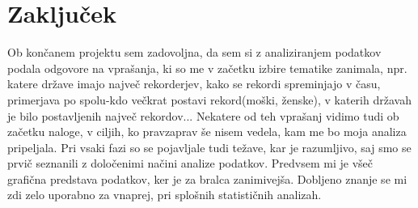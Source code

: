 \documentclass[11pt,a4paper]{article}
\begin{document}

\section{Zaključek}
Ob končanem projektu sem zadovoljna, da sem si z analiziranjem podatkov podala odgovore na vprašanja, ki so me v začetku izbire tematike zanimala, npr. katere države imajo največ rekorderjev, kako se rekordi spreminjajo v času, primerjava po spolu-kdo večkrat postavi rekord(moški, ženske), v katerih državah je bilo postavljenih največ rekordov... Nekatere od teh vprašanj vidimo tudi ob začetku naloge, v ciljih, ko pravzaprav še nisem vedela, kam me bo moja analiza pripeljala. Pri vsaki fazi so se pojavljale tudi težave, kar je razumljivo, saj smo se prvič seznanili z določenimi načini analize podatkov. Predvsem mi je všeč grafična predstava podatkov, ker je za bralca zanimivejša. Dobljeno znanje se mi zdi zelo uporabno za vnaprej, pri splošnih statističnih analizah. 
\end{document}
